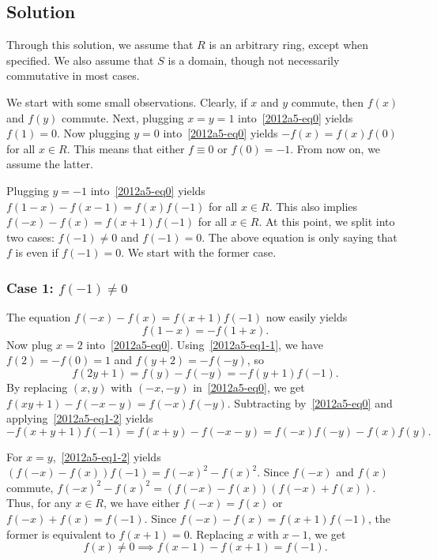 \documentclass{article}
\begin{document}
\subsection*{Solution}

Through this solution, we assume that $R$ is an arbitrary ring, except when specified.
We also assume that $S$ is a domain, though not necessarily commutative in most cases.

We start with some small observations.
Clearly, if $x$ and $y$ commute, then $f(x)$ and $f(y)$ commute.
Next, plugging $x = y = 1$ into~\eqref{2012a5-eq0} yields $f(1) = 0$.
Now plugging $y = 0$ into~\eqref{2012a5-eq0} yields $-f(x) = f(x) f(0)$ for all $x \in R$.
This means that either $f \equiv 0$ or $f(0) = -1$.
From now on, we assume the latter.

Plugging $y = -1$ into~\eqref{2012a5-eq0} yields $f(1 - x) - f(x - 1) = f(x) f(-1)$ for all $x \in R$.
This also implies $f(-x) - f(x) = f(x + 1) f(-1)$ for all $x \in R$.
At this point, we split into two cases: $f(-1) \neq 0$ and $f(-1) = 0$.
The above equation is only saying that $f$ is even if $f(-1) = 0$.
We start with the former case.


\subsubsection*{Case 1: $f(-1) \neq 0$}

The equation $f(-x) - f(x) = f(x + 1) f(-1)$ now easily yields
\[ f(1 - x) = -f(1 + x). \tag{1.1}\label{2012a5-eq1-1} \]
Now plug $x = 2$ into~\eqref{2012a5-eq0}.
Using~\eqref{2012a5-eq1-1}, we have $f(2) = -f(0) = 1$ and $f(y + 2) = -f(-y)$, so
\[ f(2y + 1) = f(y) - f(-y) = -f(y + 1) f(-1). \tag{1.2}\label{2012a5-eq1-2} \]
By replacing $(x, y)$ with $(-x, -y)$ in~\eqref{2012a5-eq0}, we get $f(xy + 1) - f(-x - y) = f(-x) f(-y)$.
Subtracting by~\eqref{2012a5-eq0} and applying~\eqref{2012a5-eq1-2} yields
\[ -f(x + y + 1) f(-1) = f(x + y) - f(-x - y) = f(-x) f(-y) - f(x) f(y). \tag{1.3}\label{2012a5-eq1-3} \]

For $x = y$,~\eqref{2012a5-eq1-2} yields $(f(-x) - f(x)) f(-1) = f(-x)^2 - f(x)^2$.
Since $f(-x)$ and $f(x)$ commute, $f(-x)^2 - f(x)^2 = (f(-x) - f(x))(f(-x) + f(x))$.
Thus, for any $x \in R$, we have either $f(-x) = f(x)$ or $f(-x) + f(x) = f(-1)$.
Since $f(-x) - f(x) = f(x + 1) f(-1)$, the former is equivalent to $f(x + 1) = 0$.
Replacing $x$ with $x - 1$, we get
\[ f(x) \neq 0 \implies f(x - 1) - f(x + 1) = f(-1). \tag{1.4}\label{2012a5-eq1-4} \]
\end{document}
